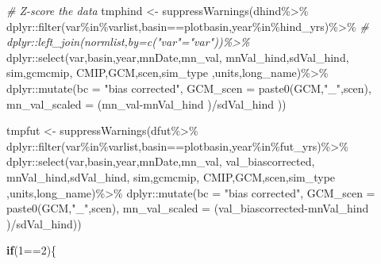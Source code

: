 \documentclass[
]{article}
\newenvironment{Shaded}{\begin{snugshade}}{\end{snugshade}}
\newcommand{\AttributeTok}[1]{\textcolor[rgb]{0.77,0.63,0.00}{#1}}
\newcommand{\CommentTok}[1]{\textcolor[rgb]{0.56,0.35,0.01}{\textit{#1}}}
\newcommand{\ControlFlowTok}[1]{\textcolor[rgb]{0.13,0.29,0.53}{\textbf{#1}}}
\newcommand{\DecValTok}[1]{\textcolor[rgb]{0.00,0.00,0.81}{#1}}
\newcommand{\FunctionTok}[1]{\textcolor[rgb]{0.00,0.00,0.00}{#1}}
\newcommand{\NormalTok}[1]{#1}
\newcommand{\OtherTok}[1]{\textcolor[rgb]{0.56,0.35,0.01}{#1}}
\newcommand{\SpecialCharTok}[1]{\textcolor[rgb]{0.00,0.00,0.00}{#1}}
\newcommand{\StringTok}[1]{\textcolor[rgb]{0.31,0.60,0.02}{#1}}
\begin{document}
\begin{Shaded}
\begin{Highlighting}[]
      \CommentTok{\# Z{-}score the data}
\NormalTok{       tmphind    }\OtherTok{\textless{}{-}} \FunctionTok{suppressWarnings}\NormalTok{(dhind}\SpecialCharTok{\%\textgreater{}\%}
\NormalTok{         dplyr}\SpecialCharTok{::}\FunctionTok{filter}\NormalTok{(var}\SpecialCharTok{\%in\%}\NormalTok{varlist,basin}\SpecialCharTok{==}\NormalTok{plotbasin,year}\SpecialCharTok{\%in\%}\NormalTok{hind\_yrs)}\SpecialCharTok{\%\textgreater{}\%}
       \CommentTok{\# dplyr::left\_join(normlist,by=c("var"="var"))\%\textgreater{}\%}
\NormalTok{         dplyr}\SpecialCharTok{::}\FunctionTok{select}\NormalTok{(var,basin,year,mnDate,mn\_val, }
\NormalTok{                       mnVal\_hind,sdVal\_hind, sim,gcmcmip,}
\NormalTok{                       CMIP,GCM,scen,sim\_type ,units,long\_name)}\SpecialCharTok{\%\textgreater{}\%}
\NormalTok{         dplyr}\SpecialCharTok{::}\FunctionTok{mutate}\NormalTok{(}\AttributeTok{bc =} \StringTok{"bias corrected"}\NormalTok{,}
                       \AttributeTok{GCM\_scen =} \FunctionTok{paste0}\NormalTok{(GCM,}\StringTok{"\_"}\NormalTok{,scen),}
                       \AttributeTok{mn\_val\_scaled =}\NormalTok{  (mn\_val}\SpecialCharTok{{-}}\NormalTok{mnVal\_hind )}\SpecialCharTok{/}\NormalTok{sdVal\_hind ))}
       
\NormalTok{       tmpfut    }\OtherTok{\textless{}{-}}  \FunctionTok{suppressWarnings}\NormalTok{(dfut}\SpecialCharTok{\%\textgreater{}\%}
\NormalTok{         dplyr}\SpecialCharTok{::}\FunctionTok{filter}\NormalTok{(var}\SpecialCharTok{\%in\%}\NormalTok{varlist,basin}\SpecialCharTok{==}\NormalTok{plotbasin,year}\SpecialCharTok{\%in\%}\NormalTok{fut\_yrs)}\SpecialCharTok{\%\textgreater{}\%}
\NormalTok{         dplyr}\SpecialCharTok{::}\FunctionTok{select}\NormalTok{(var,basin,year,mnDate,mn\_val, val\_biascorrected, }
\NormalTok{                       mnVal\_hind,sdVal\_hind, sim,gcmcmip,}
\NormalTok{                       CMIP,GCM,scen,sim\_type ,units,long\_name)}\SpecialCharTok{\%\textgreater{}\%}         
\NormalTok{         dplyr}\SpecialCharTok{::}\FunctionTok{mutate}\NormalTok{(}\AttributeTok{bc =} \StringTok{"bias corrected"}\NormalTok{,}
                       \AttributeTok{GCM\_scen =} \FunctionTok{paste0}\NormalTok{(GCM,}\StringTok{"\_"}\NormalTok{,scen),}
                       \AttributeTok{mn\_val\_scaled =}\NormalTok{  (val\_biascorrected}\SpecialCharTok{{-}}\NormalTok{mnVal\_hind )}\SpecialCharTok{/}\NormalTok{sdVal\_hind))}
       
       \ControlFlowTok{if}\NormalTok{(}\DecValTok{1}\SpecialCharTok{==}\DecValTok{2}\NormalTok{)\{}
         

\end{Highlighting}
\end{Shaded}
\end{document}
